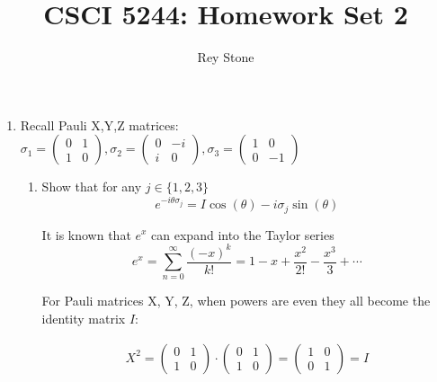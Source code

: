 \documentclass[11pt]{article}
\title{CSCI 5244: Homework Set 2}
\date{}
\author{Rey Stone}
\begin{document}
\maketitle

\begin{enumerate}
	\item Recall Pauli X,Y,Z matrices:
	      $\sigma_1 =
		      \begin{pmatrix}
			      0 & 1 \\ 1 & 0
		      \end{pmatrix},
		      \sigma_2 =
		      \begin{pmatrix}
			      0 & -i \\ i & 0
		      \end{pmatrix},
		      \sigma_3 =
		      \begin{pmatrix}
			      1 & 0 \\ 0 & -1
		      \end{pmatrix}
	      $

	      \begin{enumerate}
		      \item Show that for any $j \in {\{1,2,3\}}$
		            \begin{equation*}
			            e^{-i \theta \sigma_j} = I \cos(\theta)-i \sigma_j \sin(\theta)
		            \end{equation*}

		            It is known that ${e}^x$ can expand into the Taylor series
		            \begin{equation*}
			            e^x = \sum_{n=0}^{\infty} \frac{{(-x)}^k}{k!}=  1 - x + \frac{x^2}{2!} - \frac{x^3}{3} + \cdots
		            \end{equation*}

		            For Pauli matrices X, Y, Z, when powers are even they all become the identity matrix $I$:

		            \begin{align*}
			            X^2 =
			            \begin{pmatrix} 0 & 1 \\ 1 & 0 \end{pmatrix}
			            \cdot
			            \begin{pmatrix} 0 & 1 \\ 1 & 0 \end{pmatrix}
			            =
			            \begin{pmatrix} 1 & 0 \\ 0 & 1 \end{pmatrix}
			            = I
		            \end{align*}


\end{enumerate}
\end{enumerate}
\end{document}
